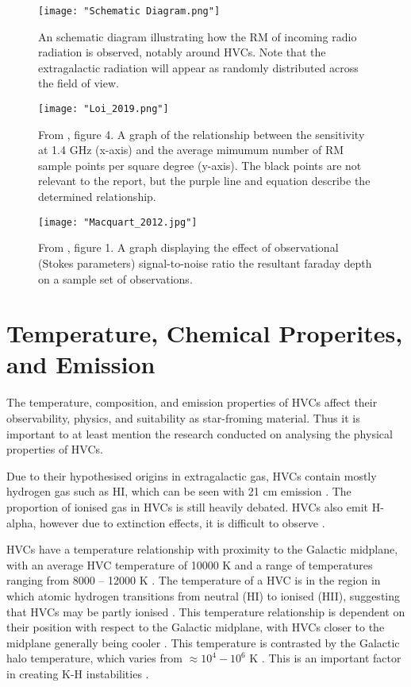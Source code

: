 \begin{figure}
    \texttt{[image: "Schematic Diagram.png"]}
    \centering
    \caption{An schematic diagram illustrating how the RM of incoming radio radiation is observed, notably around HVCs. Note that the extragalactic radiation will appear as randomly distributed across the field of view.}
    \label{fig:schema}
\end{figure}

\begin{figure}
    \texttt{[image: "Loi\_2019.png"]}
    \centering
    \caption{From \cite{ID59}, figure 4. A graph of the relationship between the sensitivity at 1.4 GHz (x-axis) and the average mimumum number of RM sample points per square degree (y-axis). The black points are not relevant to the report, but the purple line and equation describe the determined relationship.}
    \label{fig:loi}
\end{figure}

\begin{figure}
    \texttt{[image: "Macquart\_2012.jpg"]}
    \centering
    \caption{From \cite{ID60}, figure 1. A graph displaying the effect of observational (Stokes parameters) signal-to-noise ratio the resultant faraday depth on a sample set of observations.}
    \label{fig:snr}
\end{figure}



\section{Temperature, Chemical Properites, and Emission}
\label{sec:chem}

The temperature, composition, and emission properties of HVCs affect their observability, physics, and suitability as star-froming material. Thus it is important to at least mention the research conducted on analysing the physical properties of HVCs.

Due to their hypothesised origins in extragalactic gas, HVCs contain mostly hydrogen gas such as HI, which can be seen with 21 cm emission \citep{ID7, ID8, ID6}. The proportion of ionised gas in HVCs is still heavily debated. HVCs also emit H-alpha, however due to extinction effects, it is difficult to observe \citep{ID9, ID43}.

HVCs have a temperature relationship with proximity to the Galactic midplane, with an average HVC temperature of 10000 K and a range of temperatures ranging from 8000 – 12000 K \citep{ID49, ID48}. The temperature of a HVC is in the region in which atomic hydrogen transitions from neutral (HI) to ionised (HII), suggesting that HVCs may be partly ionised \citep{ID49, ID48, ID68}. This temperature relationship is dependent on their position with respect to the Galactic midplane, with HVCs closer to the midplane generally being cooler \citep{ID48}. This temperature is contrasted by the Galactic halo temperature, which varies from $\approx 10^4-10^6$ K \citep{ID19}. This is an important factor in creating K-H instabilities \citep{ID51}.


